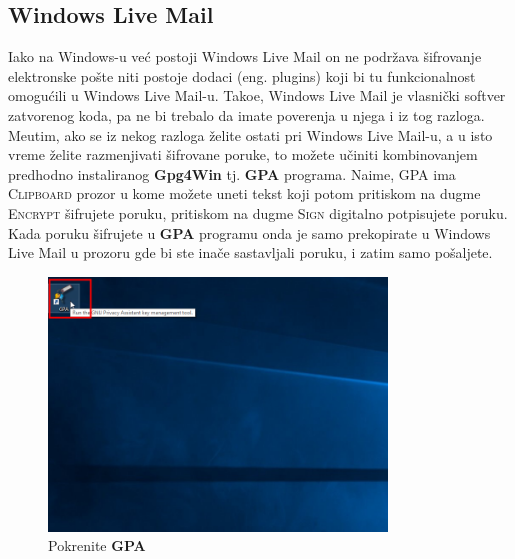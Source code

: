 \documentclass[a4paper,11pt]{article}
\begin{document}
\subsection{Windows Live Mail}
Iako na Windows-u ve\'{c} postoji \textsf{Windows Live Mail} on ne podr\v{z}ava \v{s}ifrovanje elektronske po\v{s}te
niti postoje dodaci (eng. plugins) koji bi tu funkcionalnost omogu\'{c}ili u Windows Live Mail-u.
Tako\dj{}e, Windows Live Mail je vlasni\v{c}ki softver zatvorenog koda, pa ne bi trebalo da imate poverenja u njega i iz tog razloga.
Me\dj{}utim, ako se iz nekog razloga \v{z}elite ostati pri \textsf{Windows Live Mail}-u, a u isto vreme \v{z}elite razmenjivati \v{s}ifrovane poruke, to mo\v{z}ete u\v{c}initi kombinovanjem predhodno instaliranog \textbf{Gpg4Win} tj. \textbf{GPA} programa. Naime, GPA ima \textsc{Clipboard} prozor u kome mo\v{z}ete uneti tekst koji potom pritiskom na dugme \textsc{Encrypt} \v{s}ifrujete poruku, pritiskom na dugme \textsc{Sign} digitalno potpisujete poruku. Kada poruku \v{s}ifrujete u \textbf{GPA} programu onda je samo prekopirate u \textsf{Windows Live Mail} u prozoru gde bi ste ina\v{c}e sastavljali poruku, i zatim samo po\v{s}aljete.
\newpage
\begin{figure}[!h]
	\begin{center}
		\includegraphics[width=9cm]{wlm_GPA.png}
		\caption{Pokrenite \textbf{GPA}}
		\label{gpa_WLM1}
	\end{center}
\end{figure}
\end{document}
